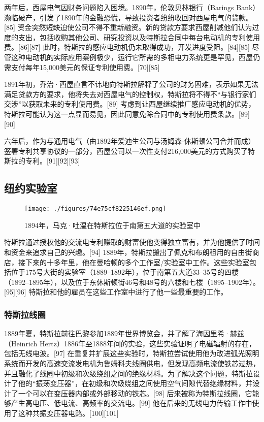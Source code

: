 两年后，西屋电气因财务问题陷入困境。1890年，伦敦贝林银行（Barings Bank）濒临破产，引发了1890年的金融恐慌，导致投资者纷纷收回对西屋电气的贷款。[85] 资金突然短缺迫使公司不得不重新融资。新的贷款方要求西屋削减他们认为过度的支出，包括收购其他公司、研究投资以及特斯拉合同中每台电动机的专利使用费。[86][87] 此时，特斯拉的感应电动机仍未取得成功，开发进度受阻。[84][85] 尽管这种电动机的实际应用案例极少，运行它所需的多相电力系统更是罕见，西屋仍需支付每年15,000美元的保证专利使用费。[70][85]  

1891年初，乔治·西屋直言不讳地向特斯拉解释了公司的财务困难，表示如果无法满足贷款方的要求，他将失去对西屋电气的控制权，特斯拉将不得不“与银行家们交涉”以获取未来的专利使用费。[89] 考虑到让西屋继续推广感应电动机的优势，特斯拉可能认为这一点显而易见，因此同意免除合同中的专利使用费条款。[89][90]  

六年后，作为与通用电气（由1892年爱迪生公司与汤姆森-休斯顿公司合并而成）签署专利共享协议的一部分，西屋公司以一次性支付216,000美元的方式购买了特斯拉的专利。[91][92][93]
\subsection{纽约实验室}
\begin{figure}[ht]
\centering
\texttt{[image: ./figures/74e75cf8225146ef.png]}
\caption{1894年，马克·吐温在特斯拉位于南第五大道的实验室中} \label{fig_Tesla_8}
\end{figure}
特斯拉通过授权他的交流电专利赚取的财富使他变得独立富有，并为他提供了时间和资金来追求自己的兴趣。[94] 1889年，特斯拉搬出了佩克和布朗租用的自由街商店，接下来的十多年里，他在曼哈顿的多个工作室/实验室中工作。这些实验室包括位于175号大街的实验室（1889–1892年），位于南第五大道33–35号的四楼（1892–1895年），以及位于东休斯顿街46号和48号的六楼和七楼（1895–1902年）。[95][96] 特斯拉和他的雇员在这些工作室中进行了他一些最重要的工作。
\subsubsection{特斯拉线圈} 
1889年夏，特斯拉前往巴黎参加1889年世界博览会，并了解了海因里希·赫兹（Heinrich Hertz）1886年至1888年间的实验，这些实验证明了电磁辐射的存在，包括无线电波。[97] 在重复并扩展这些实验时，特斯拉尝试使用他为改进弧光照明系统而开发的高速交流发电机为鲁姆科夫线圈供电，但发现高频电流使铁芯过热，并且融化了线圈中初级和次级绕组之间的绝缘材料。为了解决这个问题，特斯拉设计了他的“振荡变压器”，在初级和次级绕组之间使用空气间隙代替绝缘材料，并设计了一个可以在变压器内部或外部移动的铁芯。[98] 后来被称为特斯拉线圈，它能够产生高电压、低电流、高频率的交流电。[99] 他在后来的无线电力传输工作中使用了这种共振变压器电路。[100][101]
